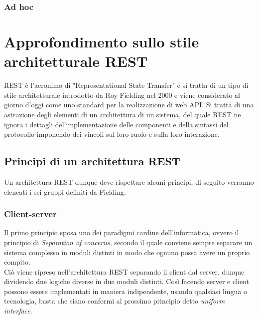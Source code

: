 \subsubsection*{Ad hoc}
\section{Approfondimento sullo stile architetturale REST}
REST è l'acronimo di "Representational State Transfer" e si tratta di un tipo di stile architetturale introdotto da Roy Fielding nel 2000 e viene considerato al giorno d'oggi come uno standard per la realizzazione di web API. Si tratta di una astrazione degli elementi di un architettura di un sistema, del quale REST ne ignora i dettagli del'implementazione delle componenti e della sintassi del protocollo imponendo dei vincoli sul loro ruolo e sulla loro interazione.
\subsection*{Principi di un architettura REST}
\label{principi-REST}
Un architettura REST dunque deve rispettare alcuni principi, di seguito verranno elencati i sei gruppi definiti da Fielding.
\subsubsection*{Client-server}
Il primo principio sposa uno dei paradigmi cardine dell'informatica, ovvero il principio di \textit{Separation of concerns}, secondo il quale conviene sempre separare un sistema complesso in moduli distinti in modo che ognuno possa avere un proprio compito.\\
Ciò viene ripreso nell'architettura REST separando il client dal server, dunque dividendo due logiche diverse in due moduli distinti. Così facendo server e client possono essere implementati in maniera indipendente, usando qualsiasi lingua o tecnologia, basta che siano conformi al prossimo principio detto \textit{uniform interface}.
